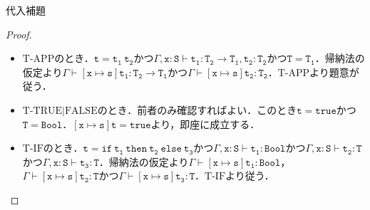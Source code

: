 \documentclass[9pt]{beamer}
\begin{document}
\begin{frame}{代入補題}
\begin{proof}
\begin{itemize}
\item $\mathrm{T}$-$\mathrm{APP}$のとき．$\mathtt{t = t_{1}\ t_{2}}$かつ$\Gamma,\mathtt{x:S\vdash t_{1}:T_{2}\rightarrow T_{1}, t_{2}:T_{2}}$かつ$\mathtt{T = T_{1}}$．帰納法の仮定より$\Gamma\vdash\mathtt{\left[x\mapsto s\right]t_{1}:T_{2}\rightarrow T_{1}}$かつ$\Gamma\vdash\mathtt{\left[x\mapsto s\right]t_{2}:T_{2}}$．$\mathrm{T}$-$\mathrm{APP}$より題意が従う．
\item $\mathrm{T}$-$\mathrm{TRUE|FALSE}$のとき．前者のみ確認すればよい．このとき$\mathtt{t = true}$かつ$\mathtt{T  = Bool}$．$\mathtt{\left[x\mapsto s\right]t = true}$より，即座に成立する．
\item $\mathrm{T}$-$\mathrm{IF}$のとき．$\mathtt{t = if\ t_{1}\ then\ t_{2}\ else\ t_{3}}$かつ$\Gamma,\mathtt{x:S\vdash t_{1}:Bool}$かつ$\Gamma,\mathtt{x:S\vdash t_{2}:T}$かつ$\Gamma,\mathtt{x:S\vdash t_{3}:T}$．帰納法の仮定より$\Gamma\vdash\mathtt{\left[x\mapsto s\right]t_{1}:Bool}$，$\Gamma\vdash\mathtt{\left[x\mapsto s\right]t_{2}:T}$かつ$\Gamma\vdash\mathtt{\left[x\mapsto s\right]t_{3}:T}$．$\mathrm{T}$-$\mathrm{IF}$より従う．
\end{itemize}
\end{proof}
\end{frame}
\end{document}
